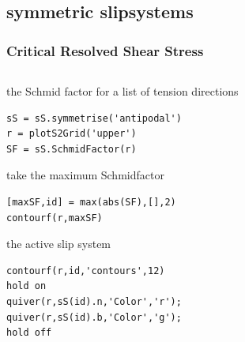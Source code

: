 \documentclass[compress]{beamer}
\begin{document}
\subsection*{symmetric slipsystems}

\begin{frame}[fragile]
  \frametitle{Critical Resolved Shear Stress}

  \begin{columns}
    \begin{column}{8cm}
      \begin{overlayarea}{\textwidth}{8cm}

the Schmid factor for a list of tension directions
\vspace{-0.2cm}
\begin{lstlisting}[style=input]
sS = sS.symmetrise('antipodal')
r = plotS2Grid('upper')
SF = sS.SchmidFactor(r)
  \end{lstlisting}

\pause
\vspace{0.1cm}
take the maximum Schmidfactor
\vspace{-0.2cm}
  \begin{lstlisting}[style=input]
[maxSF,id] = max(abs(SF),[],2)
contourf(r,maxSF)
  \end{lstlisting}

\pause

\vspace{0.1cm}
the active slip system
\vspace{-0.2cm}
\begin{lstlisting}[style=input]
contourf(r,id,'contours',12)
hold on
quiver(r,sS(id).n,'Color','r');
quiver(r,sS(id).b,'Color','g');
hold off

\end{lstlisting}
\end{overlayarea}
\end{column}
\begin{column}{4cm}


\end{column}
\end{columns}
\end{frame}
\end{document}
